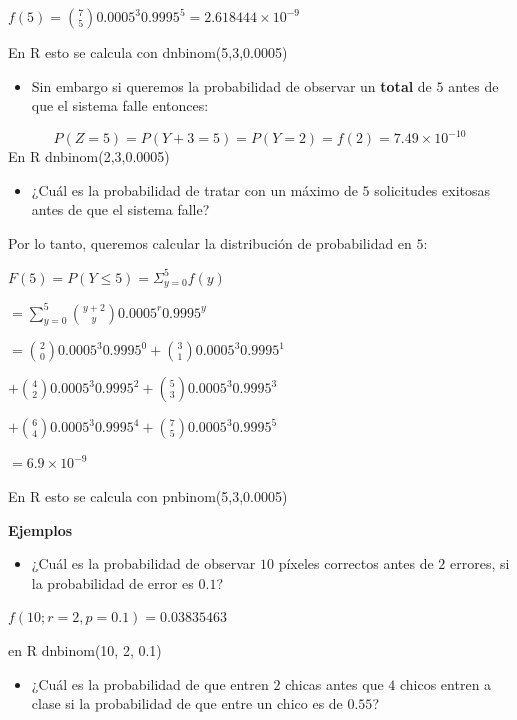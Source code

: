 \documentclass[
]{book}
\providecommand{\tightlist}{%
  \setlength{\itemsep}{0pt}\setlength{\parskip}{0pt}}
\begin{document}
\(f(5)=\binom {7} 5 0.0005^3 0.9995^5=2.618444 \times 10^{-9}\)

En R esto se calcula con dnbinom(5,3,0.0005)

\begin{itemize}
\tightlist
\item
  Sin embargo si queremos la probabilidad de observar un \textbf{total} de \(5\) antes de que el sistema falle entonces:
\end{itemize}

\[P(Z=5)=P(Y+3=5)=P(Y=2)=f(2)=7.49 \times10^{-10}\]
En R dnbinom(2,3,0.0005)

\begin{itemize}
\tightlist
\item
  ¿Cuál es la probabilidad de tratar con un máximo de \(5\) solicitudes exitosas antes de que el sistema falle?
\end{itemize}

Por lo tanto, queremos calcular la distribución de probabilidad en \(5\):

\(F(5)=P(Y\leq 5)=\Sigma_{y=0}^5 f(y)\)

\(=\sum_{y=0}^5\binom {y+2} y 0.0005^r0.9995^y\)

\(=\binom{2} 0 0.0005^3 0.9995^0 +\binom{3} 1 0.0005^3 0.9995^1\)

\(+\binom {4} 2 0.0005^3 0.9995^2 +\binom {5} 3 0.0005^3 0.9995^3\)

\(+\binom {6} 4 0.0005^3 0.9995^4 +\binom {7} 5 0.0005^3 0.9995^5\)

\(= 6.9\times 10^{-9}\)

En R esto se calcula con pnbinom(5,3,0.0005)

\textbf{Ejemplos}

\begin{itemize}
\tightlist
\item
  ¿Cuál es la probabilidad de observar \(10\) píxeles correctos antes de \(2\) errores, si la probabilidad de error es \(0.1\)?
\end{itemize}

\(f(10; r=2, p=0.1)=0.03835463\)

en R dnbinom(10, 2, 0.1)

\begin{itemize}
\tightlist
\item
  ¿Cuál es la probabilidad de que entren \(2\) chicas antes que \(4\) chicos entren a clase si la probabilidad de que entre un chico es de \(0.55\)?
\end{itemize}
\end{document}
